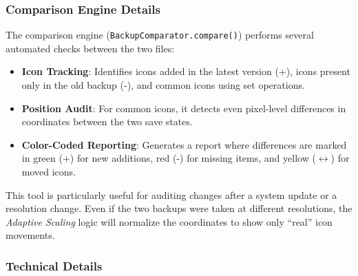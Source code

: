 \documentclass[a4paper,11pt]{article}
\begin{document}
\subsubsection{Comparison Engine Details}

The comparison engine (\texttt{BackupComparator.compare()}) performs several
automated checks between the two files:
\begin{itemize}[leftmargin=*]
  \item \textbf{Icon Tracking}: Identifies icons added in the latest
    version (+), icons present only in the old backup (-), and common
    icons using set operations.
  \item \textbf{Position Audit}: For common icons, it detects even
    pixel-level differences in coordinates between the two save states.
  \item \textbf{Color-Coded Reporting}: Generates a report where
    differences are marked in green (+) for new additions, red (-)
    for missing items, and yellow (\ensuremath{\leftrightarrow}) for
    moved icons.
\end{itemize}

\begin{infobox}
  This tool is particularly useful for auditing changes after a
  system update or a resolution change. Even if the two backups were
  taken at different resolutions, the \textit{Adaptive Scaling} logic
  will normalize the coordinates to show only ``real'' icon movements.
\end{infobox}

\subsubsection{Technical Details}
\end{document}
